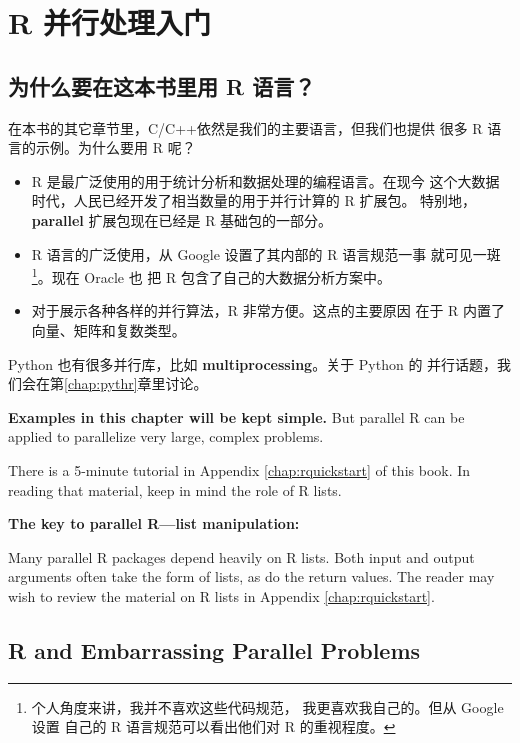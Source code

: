 \chapter{R 并行处理入门}
\label{chap:r}

\section{为什么要在这本书里用 R 语言？}

在本书的其它章节里，C/C++依然是我们的主要语言，但我们也提供
很多 R 语言的示例。为什么要用 R 呢？

\begin{itemize}

\item R 是最广泛使用的用于统计分析和数据处理的编程语言。在现今
这个大数据时代，人民已经开发了相当数量的用于并行计算的 R 扩展包。
特别地，{\bf parallel} 扩展包现在已经是 R 基础包的一部分。

\item R 语言的广泛使用，从 Google 设置了其内部的 R 语言规范一事
就可见一斑\footnote{个人角度来讲，我并不喜欢这些代码规范，
我更喜欢我自己的。但从 Google 设置
自己的 R 语言规范可以看出他们对 R 的重视程度。}。现在 Oracle 也
把 R 包含了自己的大数据分析方案中。  

\item 对于展示各种各样的并行算法，R 非常方便。这点的主要原因
在于 R 内置了向量、矩阵和复数类型。

\end{itemize}

Python 也有很多并行库，比如 {\bf multiprocessing}。关于 Python 的
并行话题，我们会在第\ref{chap:pythr}章里讨论。

{\bf Examples in this chapter will be kept simple.}  But parallel R can
be applied to parallelize very large, complex problems.

There is a 5-minute tutorial in Appendix \ref{chap:rquickstart} of this
book.  In reading that material, keep in mind the role of R lists.

{\bf The key to parallel R---list manipulation:}

Many parallel R packages depend heavily on R lists.  Both input and
output arguments often take the form of lists, as do the return values.
The reader may wish to review the material on R lists in Appendix
\ref{chap:rquickstart}.

\section{R and Embarrassing Parallel Problems}

